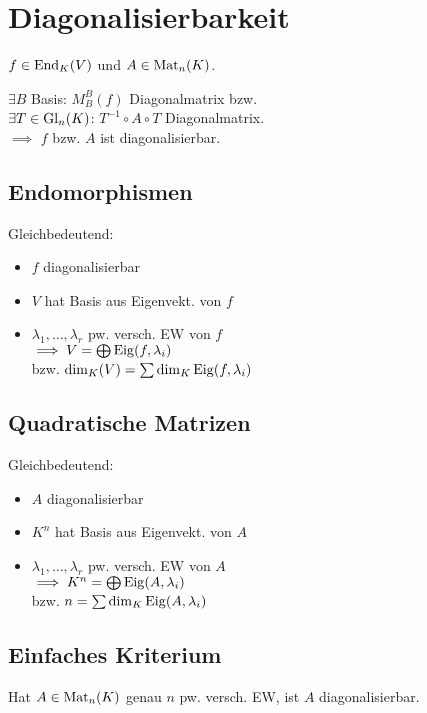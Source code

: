 \section*{Diagonalisierbarkeit}

$f\in\operatorname{End}_K(V)$ und $A\in\operatorname{Mat}_n(K)$.

$\exists B$ Basis: $M_B^B(f)$ Diagonalmatrix bzw. \\
$\exists T\in\operatorname{Gl}_n(K)$: $T^{-1}\circ A \circ T$ Diagonalmatrix. \\
$\implies$ $f$ bzw. $A$ ist diagonalisierbar.

\subsection*{Endomorphismen}
Gleichbedeutend:
\begin{itemize}
	\item $f$ diagonalisierbar
	\item $V$ hat Basis aus Eigenvekt. von $f$
	\item $\lambda_1,\dots,\lambda_r$ pw. versch. EW von $f$ \\
		$\implies V = \bigoplus \operatorname{Eig}(f,\lambda_i)$ \\
		bzw. $\dim_K(V)=\sum \dim_K\operatorname{Eig}(f, \lambda_i)$
\end{itemize}

\subsection*{Quadratische Matrizen}
Gleichbedeutend:
\begin{itemize}
	\item $A$ diagonalisierbar
	\item $K^n$ hat Basis aus Eigenvekt. von $A$
	\item $\lambda_1,\dots,\lambda_r$ pw. versch. EW von $A$ \\
		$\implies K^n = \bigoplus \operatorname{Eig}(A,\lambda_i)$ \\
		bzw. $n=\sum \dim_K\operatorname{Eig}(A, \lambda_i)$
\end{itemize}

\subsection*{Einfaches Kriterium}
Hat $A\in\operatorname{Mat}_n(K)$ genau $n$ pw. versch. EW, ist $A$ diagonalisierbar.

